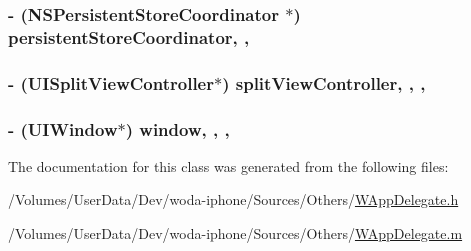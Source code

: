 \hypertarget{interface_w_app_delegate_af2cdf22ea011a4a4fb81269c8714f3de}{
\subsubsection[{persistent\-Store\-Coordinator}]{\setlength{\rightskip}{0pt plus 5cm}-\/ (N\-S\-Persistent\-Store\-Coordinator $\ast$) persistent\-Store\-Coordinator\hspace{0.3cm}{\ttfamily [read]}, {\ttfamily [nonatomic]}, {\ttfamily [strong]}}}\label{interface_w_app_delegate_af2cdf22ea011a4a4fb81269c8714f3de}
\hypertarget{interface_w_app_delegate_abaf94e45f3650314c04b169d10892408}{
\subsubsection[{split\-View\-Controller}]{\setlength{\rightskip}{0pt plus 5cm}-\/ (U\-I\-Split\-View\-Controller$\ast$) split\-View\-Controller\hspace{0.3cm}{\ttfamily [read]}, {\ttfamily [write]}, {\ttfamily [nonatomic]}, {\ttfamily [strong]}}}\label{interface_w_app_delegate_abaf94e45f3650314c04b169d10892408}
\hypertarget{interface_w_app_delegate_a1e6aa1bbff255b3ef5a285cb2c43bc46}{
\subsubsection[{window}]{\setlength{\rightskip}{0pt plus 5cm}-\/ (U\-I\-Window$\ast$) window\hspace{0.3cm}{\ttfamily [read]}, {\ttfamily [write]}, {\ttfamily [nonatomic]}, {\ttfamily [strong]}}}\label{interface_w_app_delegate_a1e6aa1bbff255b3ef5a285cb2c43bc46}


The documentation for this class was generated from the following files\-:\begin{DoxyCompactItemize}
\item 
/\-Volumes/\-User\-Data/\-Dev/woda-\/iphone/\-Sources/\-Others/\hyperlink{_w_app_delegate_8h}{W\-App\-Delegate.\-h}\item 
/\-Volumes/\-User\-Data/\-Dev/woda-\/iphone/\-Sources/\-Others/\hyperlink{_w_app_delegate_8m}{W\-App\-Delegate.\-m}\end{DoxyCompactItemize}
